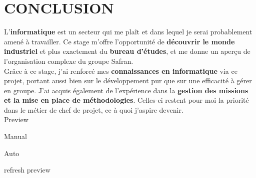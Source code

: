 \chapter{CONCLUSION}

L’\textbf{informatique} est un secteur qui me plaît et dans lequel je serai probablement amené à travailler. Ce stage m’offre l’opportunité de \textbf{découvrir le monde industriel} et plus exactement du \textbf{bureau d’études}, et me donne un aperçu de l’organisation complexe du groupe Safran.\\

Grâce à ce stage, j’ai renforcé mes \textbf{connaissances en informatique} via ce projet, portant aussi bien sur le développement pur que sur une efficacité à gérer en groupe. J’ai acquis également de l’expérience dans la \textbf{gestion des missions et la mise en place de méthodologies}. Celles-ci restent pour moi la priorité dans le métier de chef de projet, ce à quoi j'aspire devenir.\\
    


Preview 

 
Manual

Auto
   






refresh preview 
 











 












































